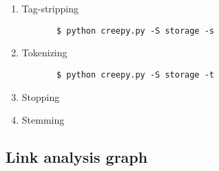 \documentclass[letterpaper,11pt,twoside]{article}
\begin{document}
\begin{enumerate}
	
	\item Tag-stripping
	\begin{verbatim} 
	   $ python creepy.py -S storage -s 
	\end{verbatim}
	
	\item Tokenizing
	\begin{verbatim} 
	   $ python creepy.py -S storage -t 
	\end{verbatim}
	
	\item Stopping
	
	\item Stemming
	
\end{enumerate}

\subsection{Link analysis graph}
\end{document}
